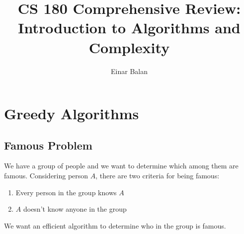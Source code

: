 
\newcommand \algorithm[3]{
    \paragraph[]{Algorithm}
    \begin{itemize}
        #1
    \end{itemize}

    \paragraph[]{Proof}
    \begin{itemize}
        #2 
    \end{itemize}
    \qed

    \paragraph[]{Complexity Analysis}
    \begin{itemize}
        #3 
    \end{itemize}
}


\title{CS 180 Comprehensive Review: \\
        Introduction to Algorithms and Complexity}
\author{Einar Balan}
\date{}



\maketitle
\tableofcontents

\chapter{Greedy Algorithms}

\section{Famous Problem}
We have a group of people and we want to determine which among them are famous. Considering person $A$, there are two criteria for being famous:
\begin{enumerate}
    \item Every person in the group knows $A$
    \item $A$ doesn't know anyone in the group 
\end{enumerate}
We want an efficient algorithm to determine who in the group is famous.

